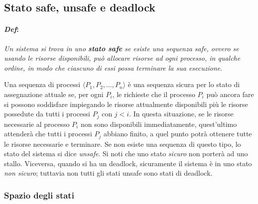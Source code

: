 \documentclass[a4paper,12pt, twoside]{report}
\newcommand{\defbox}[1]{\noindent\colorbox{shadecolor}
{\parbox{\dimexpr\textwidth-2\fboxsep\relax}{#1}}}
\begin{document}
\subsection{Stato safe, unsafe e deadlock}

\paragraph{\emph{Def}:}
\begin{center}
\defbox{\emph{Un sistema si trova in uno \textbf{stato safe} se esiste una sequenza safe, ovvero se usando le risorse
disponibili, pu\`o allocare risorse ad ogni processo, in qualche ordine, in modo che ciascuno di essi possa terminare la sua esecuzione}.}
\end{center}

Una sequenza di processi $\langle P_1, P_2, \dots, P_n \rangle$ \`e una sequenza sicura per lo stato di assegnazione attuale se, per ogni $P_i$, le richieste che il processo $P_i$ pu\`o ancora fare si possono soddisfare impiegando le risorse attualmente disponibili pi\`u le risorse possedute da tutti i processi $P_j$ con $j < i$. In questa situazione, se le risorse necessarie al processo $P_i$ non sono disponibili immediatamente, quest'ultimo attender\`a che tutti i processi $P_j$ abbiano finito, a quel punto potr\`a ottenere tutte le risorse necessarie e terminare. Se non esiste una sequenza di questo tipo, lo stato del sistema si dice \emph{unsafe}.
Si noti che uno stato \emph{sicuro} non porter\`a ad uno stallo. Viceversa, quando si ha un deadlock, sicuramente il sistema \`e in uno stato \emph{non sicuro}; tuttavia non tutti gli stati unsafe sono stati di deadlock.

\subsubsection{Spazio degli stati}

\begin{center}
\end{center}
\end{document}
